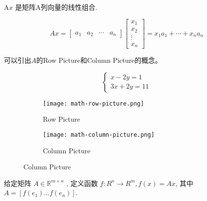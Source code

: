 \begin{corollary}
    $ \mathrm{A} x $ 是矩阵A列向量的线性组合.

$$
A x=\left[\begin{array}{llll}
a_{1} & a_{2} & \cdots & a_{n}
\end{array}\right]\left[\begin{array}{c}
x_{1} \\
x_{2} \\
\vdots \\
x_{n}
\end{array}\right]=x_{1} a_{1}+\cdots+x_{n} a_{n}
$$
\end{corollary}

可以引出$A$的Row Picture和Column Picture的概念。

\begin{example}
    \label{exm: row-column-picture}
    $$\left\{\begin{matrix} 
        
        x - 2y=1 \\  
        3x+2y=11 
      \end{matrix}\right. $$

\end{example}


   
\begin{figure}[htbp]
        \caption{Row Picture and Column Picture for \ref{exm: row-column-picture}}
    \begin{subfigure}[b]{0.8\textwidth}
        \centering
        \caption{Row Picture}
    \texttt{[image: math-row-picture.png]}
    \end{subfigure}

   
    \begin{subfigure}[b]{0.8\textwidth}
        \centering
        \caption{Column Picture}
    \texttt{[image: math-column-picture.png]}
    \end{subfigure}
\end{figure}


\begin{definition}[矩阵-向量乘积函数 $f(x)=A x$]
    给定矩阵 $ A \in \mathbb{R}^{m \times n} $ , 定义函数 $ f: R^{n} \rightarrow R^{m}, f(x)=A x $, 其中 $ A=\left[f\left(e_{1}\right) \ldots f\left(e_{n}\right)\right] $.
\end{definition}

